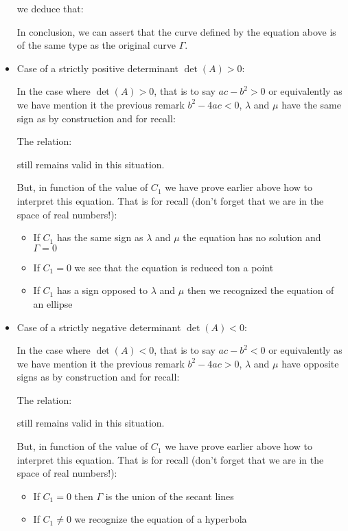 \begin{itemize}
 	we deduce that:
	
	In conclusion, we can assert that the curve defined by the equation above is of the same type as the original curve $\Gamma$.

		\item Case of a strictly positive determinant $\det(A)>0$:
		
		In the case where $\det(A)>0$, that is to say $ac-b^2>0$ or equivalently as we have mention it the previous remark $b^2-4ac<0$, $\lambda$ and $\mu$ have the same sign as by construction and for recall:
		
		The relation:
		
		still remains valid in this situation.
	
		But, in function of the value of $C_1$ we have prove earlier above how to interpret this equation. That is for recall (don't forget that we are in the space of real numbers!):
		\begin{itemize}
			\item If $C_1$ has the same sign as $\lambda$ and $\mu$ the equation has no solution and $\Gamma=0$
	
			\item If $C_1=0$ we see that the equation is reduced ton a point
	
			\item If $C_1$ has a sign opposed to $\lambda$ and $\mu$ then we recognized the equation of an ellipse
		\end{itemize}

		\item Case of a strictly negative determinant $\det(A)<0$:
		
		In the case where $\det(A)<0$, that is to say $ac-b^2<0$ or equivalently as we have mention it the previous remark $b^2-4ac>0$, $\lambda$ and $\mu$ have opposite signs as by construction and for recall:
		
		The relation:
		
		still remains valid in this situation.

		But, in function of the value of $C_1$ we have prove earlier above how to interpret this equation. That is for recall (don't forget that we are in the space of real numbers!):
		\begin{itemize}
			\item If $C_1=0$ then $\Gamma$ is the union of the secant lines
	
			\item If $C_1\neq 0$ we recognize the equation of a hyperbola
		\end{itemize}


\end{itemize}

